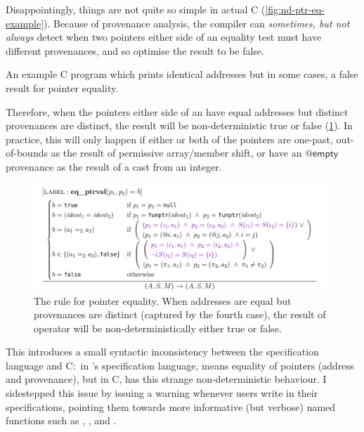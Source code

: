 Disappointingly, things are not quite so simple in actual C
(\cref{fig:nd-ptr-eq-example}). Because of provenance analysis, the compiler can
\emph{sometimes, but not always} detect when two pointers either side of an
equality test must have different provenances, and so optimise the result to be
false.

\begin{marginfigure}
    \caption{An example C program which prints identical addresses but
        in some cases, a false result for pointer equality.}\label{fig:nd-ptr-eq-example}
\end{marginfigure}

Therefore, when the pointers either side of an \cinline{==} have equal
addresses but distinct provenances are distinct, the result will be
non-deterministic true or false (\cref{fig:nd-ptr-eq}). In practice, this will
only happen if either or both of the pointers are one-past, out-of-bounds as
the result of permissive array/member shift, or have an $@\mathsf{empty}$
provenance as the result of a cast from an integer.

\begin{figure}
    \includegraphics{figures/mem-model-pnvi-nd-ptr-eq}
    \caption{The  rule for pointer equality. When addresses
        are equal but provenances are distinct (captured by the fourth case),
        the result of \cinline{==} operator will be non-deterministically either
        true or false.}\label{fig:nd-ptr-eq}
\end{figure}

This introduces a small syntactic inconsistency between the specification
language and C:\ in 's specification language, \cninline{==} means
equality of pointers (address and provenance), but in C, \cinline{==} has
this strange non-deterministic behaviour. I sidestepped this issue by issuing a
warning whenever users write \cninline{==} in their specifications, pointing
them towards more informative (but verbose) named functions such as
, , and .

